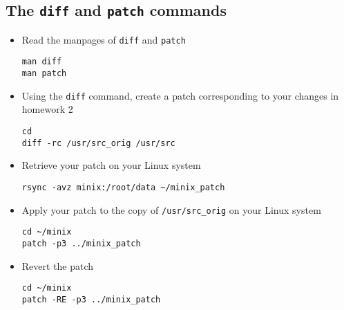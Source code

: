 \documentclass{article}
\begin{document}
\subsection{The \texttt{diff} and \texttt{patch} commands}
\begin{itemize}
\item Read the manpages of \texttt{diff} and \texttt{patch}
\begin{verbatim}
man diff
man patch
\end{verbatim}
\item Using the \texttt{diff} command, create a patch corresponding to your changes in homework 2
\begin{verbatim}
cd
diff -rc /usr/src_orig /usr/src
\end{verbatim}
\item Retrieve your patch on your Linux system
\begin{verbatim}
rsync -avz minix:/root/data ~/minix_patch
\end{verbatim}
\item Apply your patch to the copy of \texttt{/usr/src_orig} on your Linux system
\begin{verbatim}
cd ~/minix
patch -p3 ../minix_patch
\end{verbatim}
\item Revert the patch
\begin{verbatim}
cd ~/minix
patch -RE -p3 ../minix_patch
\end{verbatim}
\end{itemize}
\end{document}
